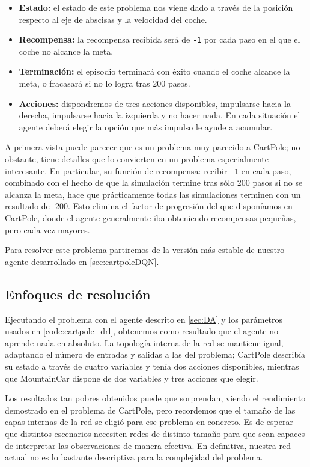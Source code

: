 \begin{itemize}
    \item \textbf{Estado:} el estado de este problema nos viene dado a través de la posición respecto al eje de abscisas y la velocidad del coche.
    \item \textbf{Recompensa:} la recompensa recibida será de \texttt{-1} por cada paso en el que el coche no alcance la meta.
    \item \textbf{Terminación:} el episodio terminará con éxito cuando el coche alcance la meta, o fracasará si no lo logra tras 200 pasos.
    \item \textbf{Acciones:} dispondremos de tres acciones disponibles, impulsarse hacia la derecha, impulsarse hacia la izquierda y no hacer nada. En cada situación el agente deberá elegir la opción que más impulso le ayude a acumular.
\end{itemize}

A primera vista puede parecer que es un problema muy parecido a CartPole; no obstante, tiene detalles que lo convierten en un problema especialmente interesante. En particular, su función de recompensa: recibir \texttt{-1} en cada paso, combinado con el hecho de que la simulación termine tras sólo 200 pasos si no se alcanza la meta, hace que prácticamente todas las simulaciones terminen con un resultado de -200. Esto elimina el factor de progresión del que disponíamos en CartPole, donde el agente generalmente iba obteniendo recompensas pequeñas, pero cada vez mayores.

Para resolver este problema partiremos de la versión más estable de nuestro agente desarrollado en \ref{sec:cartpoleDQN}.


\subsection{Enfoques de resolución}

Ejecutando el problema con el agente descrito en \ref{sec:DA} y los parámetros usados en \ref{code:cartpole_drl}, obtenemos como resultado que el agente no aprende nada en absoluto. La topología interna de la red se mantiene igual, adaptando el número de entradas y salidas a las del problema; CartPole describía su estado a través de cuatro variables y tenía dos acciones disponibles, mientras que MountainCar dispone de dos variables y tres acciones que elegir.

Los resultados tan pobres obtenidos puede que sorprendan, viendo el rendimiento demostrado en el problema de CartPole, pero recordemos que el tamaño de las capas internas de la red se eligió para ese problema en concreto. Es de esperar que distintos escenarios necesiten redes de distinto tamaño para que sean capaces de interpretar las observaciones de manera efectiva. En definitiva, nuestra red actual no es lo bastante descriptiva para la complejidad del problema.


